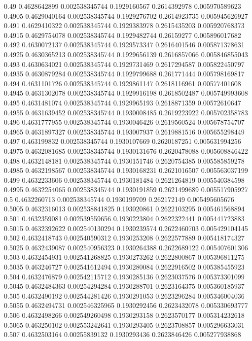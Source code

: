 {0.49 0.4628642899 0.002538345744 0.1929160567 0.2614392978 0.005970589623
0.4905 0.4629040164 0.002538345744 0.1929276702 0.2614923735 0.005945626927
0.491 0.4629410322 0.002538345744 0.1929383978 0.2615435203 0.005920768373
0.4915 0.4629754078 0.002538345744 0.1929482744 0.26159277 0.005896017682
0.492 0.4630072137 0.002538345744 0.1929573347 0.2616401546 0.005871378631
0.4925 0.4630365213 0.002538345744 0.1929656139 0.2616857066 0.005846855043
0.493 0.4630634021 0.002538345744 0.1929731469 0.2617294587 0.005822450797
0.4935 0.4630879284 0.002538345744 0.1929799688 0.261771444 0.005798169817
0.494 0.4631101726 0.002538345744 0.1929861147 0.2618116961 0.00577401608
0.4945 0.4631302078 0.002538345744 0.1929916198 0.2618502487 0.005749993608
0.495 0.4631481074 0.002538345744 0.1929965193 0.2618871359 0.00572610647
0.4955 0.4631639452 0.002538345744 0.1930008485 0.2619223922 0.005702358783
0.496 0.4631777955 0.002538345744 0.1930046426 0.2619560524 0.005678754707
0.4965 0.4631897327 0.002538345744 0.193007937 0.2619881516 0.005655298449
0.497 0.463199832 0.002538345744 0.1930107669 0.2620187251 0.005631994256
0.4975 0.4632081685 0.002538345744 0.1930131676 0.2620478088 0.005608846422
0.498 0.4632148181 0.002538345744 0.1930151746 0.2620754385 0.005585859278
0.4985 0.4632198567 0.002538345744 0.1930168231 0.2621016507 0.005563037199
0.499 0.4632233606 0.002538345744 0.1930181484 0.2621264819 0.005540384598
0.4995 0.4632254065 0.002538345744 0.1930191859 0.2621499689 0.005517905927
0.5 0.4632260713 0.002538345744 0.1930199709 0.262172149 0.005495605676
0.5005 0.4632316013 0.002538841825 0.193020861 0.2622103295 0.005461568894
0.501 0.4632359081 0.002539559656 0.1930223804 0.2622322441 0.005441723883
0.5015 0.4632392622 0.002540130294 0.1930239574 0.2622460703 0.005429104145
0.502 0.4632418743 0.002540590312 0.1930253208 0.2622577889 0.005418174327
0.5025 0.4632439087 0.002540956323 0.1930264388 0.2622689122 0.005407601306
0.503 0.4632454931 0.002541268825 0.1930273262 0.2622800867 0.005396811275
0.5035 0.463246727 0.002541612494 0.1930280084 0.2622916502 0.005385455923
0.504 0.4632476879 0.002542115712 0.1930285136 0.2623037576 0.005373301099
0.5045 0.4632484363 0.00254294284 0.1930288701 0.2623164375 0.005360185937
0.505 0.4632490192 0.002544281426 0.1930291053 0.2623296284 0.005346004036
0.5055 0.4632494731 0.002546325965 0.1930292456 0.2623432078 0.005330693777
0.506 0.4632498266 0.002549260498 0.1930293158 0.2623570177 0.005314232618
0.5065 0.463250102 0.002553242641 0.1930293405 0.2623708857 0.005296633031
0.507 0.4632503164 0.00255839132 0.1930293436 0.2623846426 0.005277938868
}
